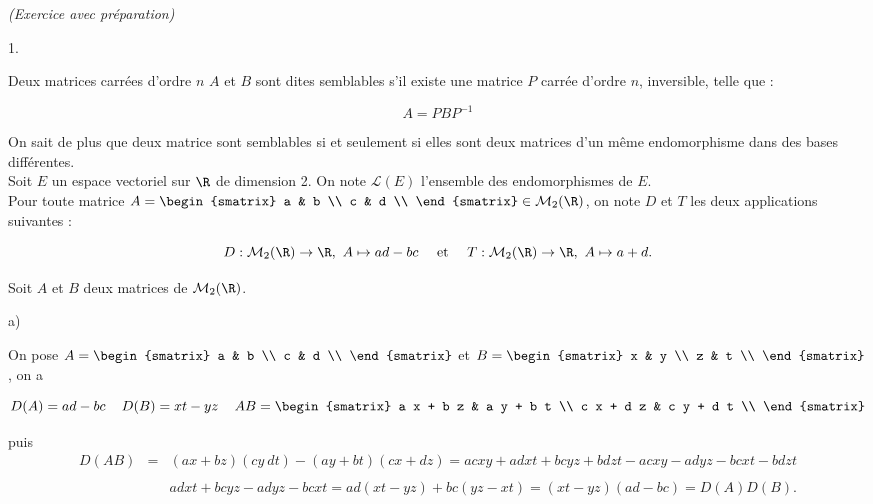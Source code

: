 \documentclass[11pt]{article}%
\begin{document}
 \begin{exercice}{\it (Exercice avec préparation)}~
 \begin{noliste}{1.}
 \setlength{\itemsep}{4mm}
 \item Deux matrices carrées d'ordre $n$ $A$ et $B$ sont dites
semblables s'il existe une matrice $P$ carrée d'ordre $n$, inversible,
telle que : 
 
\[
 A = P B P^{-1} 
\]

 On sait de plus que deux matrice sont semblables si et seulement si
elles sont deux matrices d'un même endomorphisme dans des bases
différentes. \\

 Soit $E$ un espace vectoriel sur $\R$ de dimension 2. On note
$\mathcal{L} ( E )$ l'ensemble des endomorphismes de $E$. \\
 Pour toute matrice $A = \begin{smatrix}
a & b \\
c & d \\
\end{smatrix}
\in \mathcal{M}_{2} (\R) $, on note $D$ et $T$ les deux applications
suivantes : 
 
\[
 D : \mathcal{M}_{2} (\R) \rightarrow \R, \ A \mapsto a d - b c \ \ \
\text{ et } \ \ \ T : \mathcal{M}_{2} (\R) \rightarrow \R, \ A \mapsto
a + d. 
\]

 \item Soit $A$ et $B$ deux matrices de $\mathcal{M}_{2} (\R)$.
\begin{noliste}{a)}
 \setlength{\itemsep}{2mm}

 \item On pose $A = \begin{smatrix}
a & b \\
c & d \\
\end{smatrix}
$ et $B = \begin{smatrix}
x & y \\
z & t \\
\end{smatrix}
$, on a 
 
\[
 D ( A ) = a d - b c \ \, \ \ D ( B ) = x t - y z \ \, \ \ A B =
\begin{smatrix}
a x + b z & a y + b t \\
c x + d z & c y + d t \\
\end{smatrix}
\]

 puis
 \begin{eqnarray*}
   D ( AB ) & = & (ax + bz ) (cy \ dt) - (ay + bt) (cx + d z ) = a c x y
   + a d x t + b c y z + b d z t - acxy - a d y z - b c x t - b d z t \\
   \\
   & & a d x t + b c y z - a d y z - b c x t = ad ( xt - yz ) + bc ( yz -
   xt ) = (xt - y z ) (ad - bc ) = D ( A ) D ( B ). 
 \end{eqnarray*}


\end{noliste}
\end{noliste}
\end{exercice}
\end{document}
